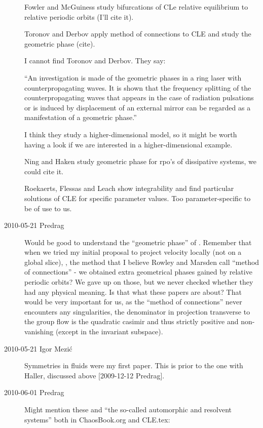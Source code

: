 \begin{description}
Fowler and McGuiness study bifurcations of CLe relative equilibrium
to relative periodic orbits (I'll cite it).

Toronov and Derbov apply method of connections to CLE and
study the geometric phase (cite).

I cannot find Toronov and Derbov. They say:

``An investigation is made of the geometric phases in a ring laser with
   counterpropagating waves. It is shown that the frequency splitting of
   the counterpropagating waves that appears in the case of radiation
   pulsations or is induced by displacement of an external mirror can be
   regarded as a manifestation of a geometric phase.''

I think they study a higher-dimensional model, so it might be worth having a look
if we are interested in a higher-dimensional example.

Ning and Haken study geometric phase
for rpo's of dissipative systems, we could cite it.

 Roekaerts, Flessas and Leach show integrability
and find particular solutions of CLE for specific parameter values.
Too parameter-specific to be of use to us.

\item[2010-05-21 Predrag] Would be good to understand the ``geometric phase''
of .
Remember that when we tried my initial
proposal to project velocity locally (not on a global slice),
,
the method that I believe Rowley and
Marsden call ``method
of connections'' - we obtained extra geometrical
phases gained by relative periodic orbits? We gave up on
those, but we never checked whether they had any physical
meaning. Is that what these papers are about? That would be
very important for us, as the ``method
of connections'' never encounters any singularities, the denominator
in projection transverse to the group flow is the quadratic casimir and
thus strictly positive and non-vanishing (except in the invariant subspace).

\item[2010-05-21 Igor Mezi\'c]
Symmetries in fluids were my first paper.
This is prior to the one with Haller, discussed
 above [2009-12-12 Predrag].

\item[2010-06-01 Predrag]
Might mention these and ``the so-called automorphic and resolvent systems''
both in ChaosBook.org and CLE.tex:


\end{description}
